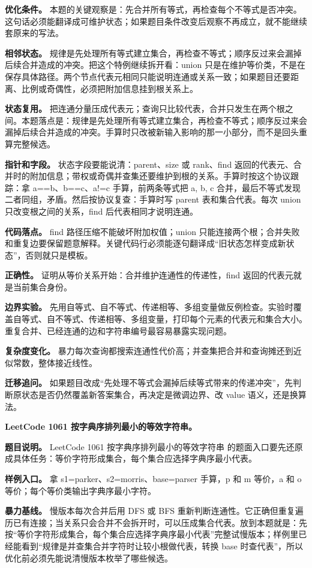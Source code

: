 \textbf{优化条件。} 本题的关键观察是：先合并所有等式，再检查每个不等式是否冲突。这句话必须能翻译成可维护状态；如果题目条件改变后观察不再成立，就不能继续套原来的写法。

\textbf{相邻状态。} 规律是先处理所有等式建立集合，再检查不等式；顺序反过来会漏掉后续合并造成的冲突。把这个特例继续拆开看：union 只是在维护等价类，不是在保存具体路径。两个节点代表元相同只能说明连通或关系一致；如果题目还要距离、比例或奇偶性，必须把附加信息挂到根关系上。

\textbf{状态复用。} 把连通分量压成代表元；查询只比较代表，合并只发生在两个根之间。本题落点是：规律是先处理所有等式建立集合，再检查不等式；顺序反过来会漏掉后续合并造成的冲突。手算时只改被新输入影响的那一小部分，而不是回头重算完整候选。

\textbf{指针和字段。} 状态字段要能说清：parent、size 或 rank、find 返回的代表元、合并时的附加信息；带权或奇偶并查集还要维护到根的关系。手算时按这个协议跟踪：拿 a==b、b==c、a!=c 手算，前两条等式把 a, b, c 合并，最后不等式发现二者同组，矛盾。然后按协议复查：手算时写 parent 表和集合代表。每次 union 只改变根之间的关系，find 后代表相同才说明连通。

\textbf{代码落点。} find 路径压缩不能破坏附加权值；union 只能连接两个根；合并失败和重复边要保留题意解释。关键代码行必须能逐句翻译成“旧状态怎样变成新状态”，否则就只是模板。

\textbf{正确性。} 证明从等价关系开始：合并维护连通性的传递性，find 返回的代表元就是当前集合身份。

\textbf{边界实验。} 先用自等式、自不等式、传递相等、多组变量做反例检查。实验时覆盖自等式、自不等式、传递相等、多组变量，打印每个元素的代表元和集合大小。重复合并、已经连通的边和字符串编号最容易暴露实现问题。

\textbf{复杂度变化。} 暴力每次查询都搜索连通性代价高；并查集把合并和查询摊还到近似常数，整体接近线性。

\textbf{迁移追问。} 如果题目改成“先处理不等式会漏掉后续等式带来的传递冲突”，先判断原状态是否仍然覆盖新答案集合，再决定是微调边界、改 value 语义，还是换算法。

\noindent\textbf{LeetCode 1061 按字典序排列最小的等效字符串。}

\textbf{题目说明。} LeetCode 1061 按字典序排列最小的等效字符串 的题面入口要先还原成具体任务：等价字符形成集合，每个集合应选择字典序最小代表。

\textbf{样例入口。} 拿 s1=parker、s2=morris、base=parser 手算，p 和 m 等价，a 和 o 等价；每个等价类输出字典序最小字符。

\textbf{暴力基线。} 慢版本每次合并后用 DFS 或 BFS 重新判断连通性。它正确但重复遍历已有连接；当关系只会合并不会拆开时，可以压成集合代表。放到本题就是：先按“等价字符形成集合，每个集合应选择字典序最小代表”完整试慢版本；样例里已经能看到“规律是并查集合并字符时让较小根做代表，转换 base 时查代表”，所以优化前必须先能说清慢版本枚举了哪些候选。


